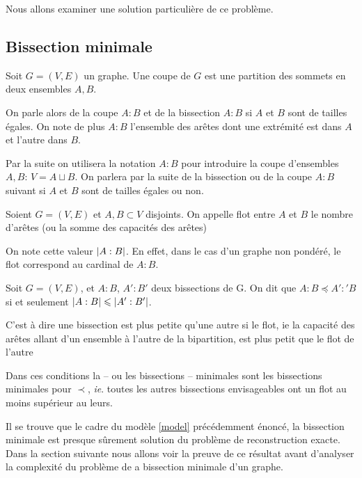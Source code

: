 \documentclass{standalone}
\begin{document}
	Nous allons examiner une solution particulière de ce problème.

\subsection{Bissection minimale}

	\begin{defn}
		Soit $G=(V, E)$ un graphe. Une coupe de $G$ est une partition des sommets en deux ensembles $A, B$.
		
		On parle alors de la coupe $A:B$ et de la bissection $A:B$ si $A$ et $B$ sont de tailles égales. On note de plus $A:B$ l'ensemble des arêtes dont une extrémité est dans $A$ et l'autre dans $B$. 
	\end{defn}

	\begin{rem}
		Par la suite on utilisera la notation $A:B$ pour introduire la coupe d'ensembles $A, B$: $V = A \sqcup B$.
		On parlera par la suite de la bissection ou de la coupe $A:B$ suivant si $A$ et $B$ sont de tailles égales ou non.
	\end{rem}

	\begin{defn}[Flot]
		Soient $G = (V, E)$ et $A, B \subset V$ disjoints. On appelle flot entre $A$ et $B$ le nombre d'arêtes (ou la somme des capacités des arêtes) 
		
		On note cette valeur $\left| A:B\right|$. En effet, dans le cas d'un graphe non pondéré, le flot correspond au cardinal de $A:B$.
	\end{defn}

	\begin{defn}
		Soit $G=(V, E)$, et $A:B$, $A':B'$ deux bissections de G.
		On dit que $A:B \preceq A':'B$ si et seulement $\left| A:B\right| \leqslant \left| A':B'\right|$.
		
		C'est à dire une bissection est plus petite qu'une autre si le flot, ie la capacité des arêtes allant d'un ensemble à l'autre de la bipartition, est plus petit que le flot de l'autre
	\end{defn}

	Dans ces conditions la -- ou les bissections -- minimales sont les bissections minimales pour $\prec$, \textit{ie}. toutes les autres bissections envisageables ont un flot au moins supérieur au leurs.
	
	Il se trouve que le cadre du modèle \ref{model} précédemment énoncé, la bissection minimale est presque sûrement solution du problème de reconstruction exacte\cite{dyier}. Dans la section suivante nous allons voir la preuve de ce résultat avant d'analyser la complexité du problème de a bissection minimale d'un graphe\cite{simplenphard}.
\end{document}
